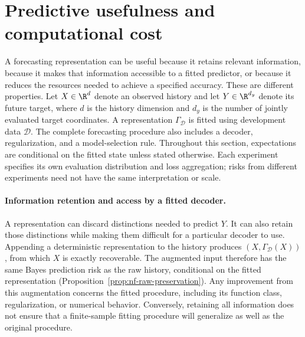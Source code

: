 \section{Predictive usefulness and computational cost}
\label{sec:utility-question}

A forecasting representation can be useful because it retains relevant
information, because it makes that information accessible to a fitted
predictor, or because it reduces the resources needed to achieve a specified
accuracy. These are different properties. Let $X\in\R^d$ denote an observed
history and let $Y\in\R^{d_y}$ denote its future target, where $d$ is the
history dimension and $d_y$ is the number of jointly evaluated target
coordinates. A representation $\Gamma_{\mathcal D}$ is fitted using
development data $\mathcal D$. The complete forecasting procedure also
includes a decoder, regularization, and a model-selection rule. Throughout
this section, expectations are conditional on the fitted state unless
stated otherwise. Each experiment specifies its own evaluation distribution
and loss aggregation; risks from different experiments need not have the
same interpretation or scale.

\paragraph{Information retention and access by a fitted decoder.}
A representation can discard distinctions needed to predict $Y$. It can
also retain those distinctions while making them difficult for a particular
decoder to use. Appending a deterministic representation to the history
produces $(X,\Gamma_{\mathcal D}(X))$, from which $X$ is exactly recoverable.
The augmented input therefore has the same Bayes prediction risk as the raw
history, conditional on the fitted representation
(Proposition~\ref{prop:nf-raw-preservation}). Any improvement from this
augmentation concerns the fitted procedure, including its function class,
regularization, or numerical behavior. Conversely, retaining all information
does not ensure that a finite-sample fitting procedure will generalize as
well as the original procedure.

